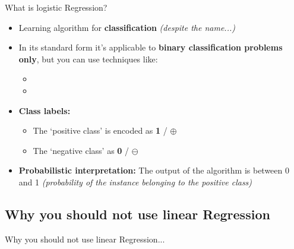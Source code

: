 \begin{frame}{What is logistic Regression?}{}
	\begin{itemize}
		\item Learning algorithm for \textbf{classification} {\footnotesize \textit{(despite the name...)}}
		\item In its standard form it's applicable to \textbf{binary classification problems only}, but you can use techniques like:
		\begin{itemize}
			\item {}
			\item {}
		\end{itemize}
		\item \textbf{Class labels:}
		\begin{itemize}
			\item The `positive class' is encoded as \textbf{1} / $\oplus$
			\item The `negative class' as \textbf{0} / $\ominus$
		\end{itemize}
		\item \textbf{Probabilistic interpretation:} The output of the algorithm is between 0 and 1
			{\footnotesize \textit{(probability of the instance belonging to the positive class)}}
	\end{itemize}
\end{frame}


\subsection{Why you should not use linear Regression}

\begin{frame}{Why you should not use linear Regression...}{}\important
	
\end{frame}


